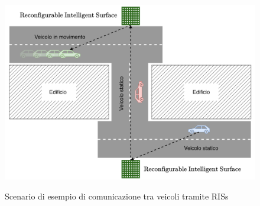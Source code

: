 \begin{figure}
  \centering
  \def\stackalignment{l}{ \includegraphics[width=\linewidth]{images/examples/ris-intersection.png} }
  \caption{Scenario di esempio di comunicazione tra veicoli tramite RISs\cite{cooperis}}
  \label{fig:example-ris-scenario}
  \vspace{1em}
\end{figure}

